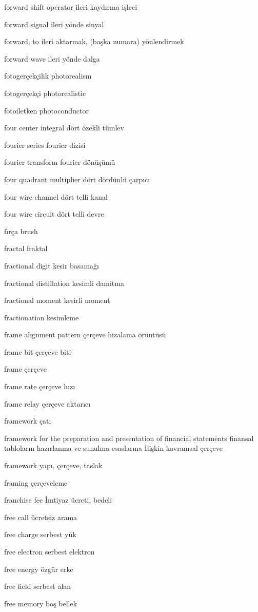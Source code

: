 \documentclass[12pt,fleqn]{article}\usepackage{../../common}
\begin{document}
forward shift operator ileri kaydırma işleci

forward signal ileri yönde sinyal

forward, to ileri aktarmak, (başka numara) yönlendirmek

forward wave ileri yönde dalga

fotogerçekçilik photorealism

fotogerçekçi photorealistic

fotoiletken photoconductor

four center integral dört özekli tümlev

fourier series fourier dizisi

fourier transform fourier dönüşümü

four quadrant multiplier dört dördünlü çarpıcı

four wire channel dört telli kanal

four wire circuit dört telli devre

fırça brush

fractal fraktal

fractional digit kesir basamağı

fractional distillation kesimli damitma

fractional moment kesirli moment

fractionation kesimleme

frame alignment pattern çerçeve hizalama örüntüsü

frame bit çerçeve biti

frame çerçeve

frame rate çerçeve hızı

frame relay çerçeve aktarıcı

framework çatı

framework for the preparation and presentation of financial statements finansal tabloların hazırlanma ve sunulma esaslarına İlişkin kavramsal çerçeve

framework yapı, çerçeve, taslak

framing çerçeveleme

franchise fee İmtiyaz ücreti, bedeli

free call ücretsiz arama

free charge serbest yük

free electron serbest elektron

free energy özgür erke

free field serbest alan

free memory boş bellek
\end{document}

